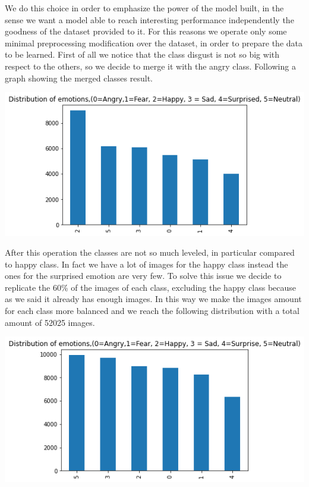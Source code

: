 \documentclass[10pt,twocolumn,letterpaper]{article}
\begin{document}
We do this choice in order to emphasize the power of the model built, in the sense we want a model able to reach interesting performance independently
the goodness of the dataset provided to it.
For this reasons we operate only some minimal preprocessing modification over the dataset, in order to prepare the data to be learned. 
First of all we notice that the class disgust is not so big with respect to the others, so we decide to merge it with the angry class.
Following a graph showing the merged classes result.
\begin{center}
   \includegraphics[width=1\linewidth]{./immagini/6_classi.png}
\end{center}
After this operation the classes are not so much leveled, in particular compared to happy class. 
In fact we have a lot of images for the happy class instead the ones for the surprised emotion are very few. 
To solve this issue we decide to replicate the 60\% of the images of each class, excluding the happy class because as we said it already has enough images.
In this way we make the images amount for each class more balanced and we reach the following distribution with a total amount of 52025 images. 
\begin{center}
   \includegraphics[width=1\linewidth]{./immagini/classi_bilanciate.png}
\end{center}
\end{document}
